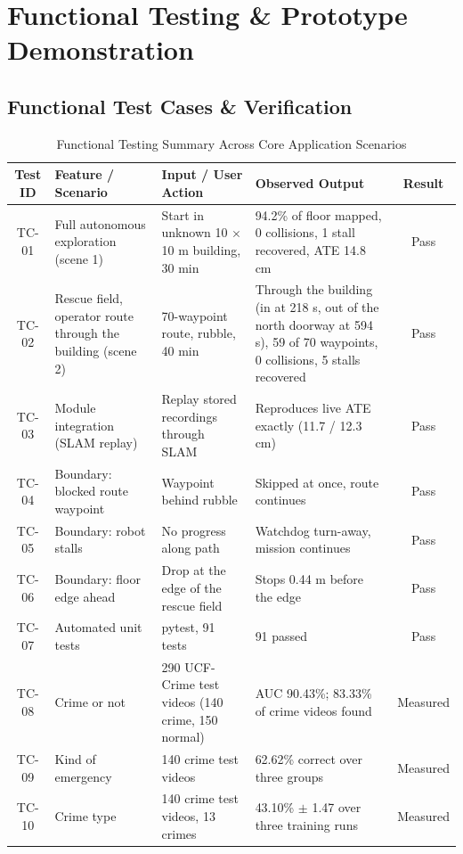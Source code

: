 \documentclass[11pt, a4paper]{article}
\begin{document}
\section{Functional Testing \& Prototype Demonstration}

\subsection{Functional Test Cases \& Verification}
\begin{table}[H]
    \centering
    \footnotesize
    \renewcommand{\arraystretch}{1.25}
    \begin{tabular}{|c|p{3.2cm}|p{3.2cm}|p{4.8cm}|c|}
        \hline
        \textbf{Test ID} & \textbf{Feature / Scenario} & \textbf{Input / User Action} & \textbf{Observed Output} & \textbf{Result} \\
        \hline
        TC-01 & Full autonomous exploration (scene 1) & Start in unknown 10 $\times$ 10 m building, 30 min & 94.2\% of floor mapped, 0 collisions, 1 stall recovered, ATE 14.8 cm & Pass \\
        \hline
        TC-02 & Rescue field, operator route through the building (scene 2) & 70-waypoint route, rubble, 40 min & Through the building (in at 218 s, out of the north doorway at 594 s), 59 of 70 waypoints, 0 collisions, 5 stalls recovered & Pass \\
        \hline
        TC-03 & Module integration (SLAM replay) & Replay stored recordings through SLAM & Reproduces live ATE exactly (11.7 / 12.3 cm) & Pass \\
        \hline
        TC-04 & Boundary: blocked route waypoint & Waypoint behind rubble & Skipped at once, route continues & Pass \\
        \hline
        TC-05 & Boundary: robot stalls & No progress along path & Watchdog turn-away, mission continues & Pass \\
        \hline
        TC-06 & Boundary: floor edge ahead & Drop at the edge of the rescue field & Stops 0.44 m before the edge & Pass \\
        \hline
        TC-07 & Automated unit tests & pytest, 91 tests & 91 passed & Pass \\
        \hline
        TC-08 & Crime or not & 290 UCF-Crime test videos (140 crime, 150 normal) & AUC 90.43\%; 83.33\% of crime videos found & Measured \\
        \hline
        TC-09 & Kind of emergency & 140 crime test videos & 62.62\% correct over three groups & Measured \\
        \hline
        TC-10 & Crime type & 140 crime test videos, 13 crimes & 43.10\% $\pm$ 1.47 over three training runs & Measured \\
        \hline
    \end{tabular}
    \caption{Functional Testing Summary Across Core Application Scenarios}
\end{table}
\end{document}
